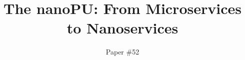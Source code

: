 \documentclass[sigconf,10pt,preprint,balance]{acmart}
\begin{document}
\title{The nanoPU: From Microservices to Nanoservices}

\author{Paper \#52}







\if{}
    \setcounter{page}{0}
    \listoftodos {}
    \clearpage
\fi



\maketitle

\if{}
    \pagestyle{plain}
\fi











\label{lastpage}

{\footnotesize 


}

\label{totalpage}
\end{document}
